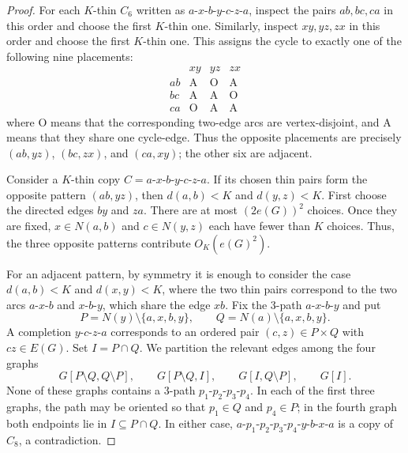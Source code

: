 \documentclass[11pt,letterpaper]{article}
\begin{document}
\begin{proof}
For each \(K\)-thin \(C_6\) written as \(a\)-\(x\)-\(b\)-\(y\)-\(c\)-\(z\)-\(a\), inspect the pairs
\(ab,bc,ca\) in this order and choose the first \(K\)-thin one. Similarly, inspect \(xy,yz,zx\) in
this order and choose the first \(K\)-thin one. This assigns the cycle to exactly one of the
following nine placements:
\[
\begin{array}{c|ccc}
 & xy & yz & zx\\ \hline
ab & \mathrm{A} & \mathrm{O} & \mathrm{A}\\
bc & \mathrm{A} & \mathrm{A} & \mathrm{O}\\
ca & \mathrm{O} & \mathrm{A} & \mathrm{A}
\end{array}
\]
where \(\mathrm{O}\) means that the corresponding two-edge arcs are vertex-disjoint, and
\(\mathrm{A}\) means that they share one cycle-edge. Thus the opposite placements are precisely
\((ab,yz)\), \((bc,zx)\), and \((ca,xy)\); the other six are adjacent. %

Consider a \(K\)-thin copy $C=a$-$x$-$b$-$y$-$c$-$z$-$a$. If its chosen thin pairs form the opposite pattern
\((ab,yz)\), then \(d(a,b)<K\) and \(d(y,z)<K\). First choose the directed edges \(by\) and
\(za\). There are at most \((2e(G))^2\) choices. Once they are fixed,
\(x\in N(a,b)\) and \(c\in N(y,z)\) each have fewer than \(K\) choices. Thus, the three opposite patterns contribute \(O_K(e(G)^2)\).

For an adjacent pattern, by symmetry it is enough to consider the case $d(a,b)<K$ and $d(x,y)<K$,
where the two thin pairs correspond to the two arcs $a$-$x$-$b$ and $x$-$b$-$y$, which share the edge
\(xb\). Fix the 3-path $a$-$x$-$b$-$y$ and put
\[
  P=N(y)\setminus\{a,x,b,y\},\qquad
  Q=N(a)\setminus\{a,x,b,y\}.
\]
A completion $y$-$c$-$z$-$a$ corresponds to an ordered pair \((c,z)\in P\times Q\) with
\(cz\in E(G)\). Set $I=P\cap Q$. %
We partition the relevant edges among the four graphs
\[
  G[P\setminus Q,Q\setminus P],\qquad G[P\setminus Q,I],\qquad G[I,Q\setminus P],\qquad G[I].
\]
None of these graphs contains a 3-path $p_1$-$p_2$-$p_3$-$p_4$. In each of the first three
graphs, the path may be oriented so that \(p_1\in Q\) and \(p_4\in P\); in the fourth graph both
endpoints lie in \(I\subseteq P\cap Q\). In either case,
$a$-$p_1$-$p_2$-$p_3$-$p_4$-$y$-$b$-$x$-$a$
is a copy of \(C_8\), a contradiction. 


\end{proof}
\end{document}

